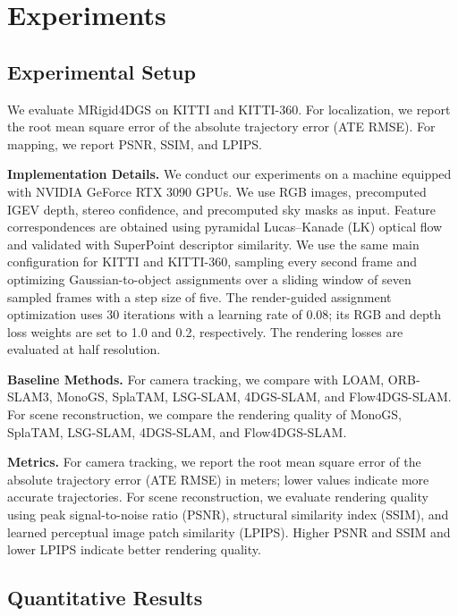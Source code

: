\section{Experiments}

\subsection{Experimental Setup}

We evaluate MRigid4DGS on KITTI and KITTI-360. For localization, we report the root mean square error of the absolute trajectory error (ATE RMSE). For mapping, we report PSNR, SSIM, and LPIPS.

\noindent\textbf{Implementation Details.}
We conduct our experiments on a machine equipped with NVIDIA GeForce RTX 3090 GPUs. We use RGB images, precomputed IGEV depth, stereo confidence, and precomputed sky masks as input. Feature correspondences are obtained using pyramidal Lucas--Kanade (LK) optical flow and validated with SuperPoint descriptor similarity. We use the same main configuration for KITTI and KITTI-360, sampling every second frame and optimizing Gaussian-to-object assignments over a sliding window of seven sampled frames with a step size of five. The render-guided assignment optimization uses 30 iterations with a learning rate of 0.08; its RGB and depth loss weights are set to 1.0 and 0.2, respectively. The rendering losses are evaluated at half resolution.

\noindent\textbf{Baseline Methods.}
For camera tracking, we compare with LOAM, ORB-SLAM3, MonoGS, SplaTAM, LSG-SLAM, 4DGS-SLAM, and Flow4DGS-SLAM. For scene reconstruction, we compare the rendering quality of MonoGS, SplaTAM, LSG-SLAM, 4DGS-SLAM, and Flow4DGS-SLAM.

\noindent\textbf{Metrics.}
For camera tracking, we report the root mean square error of the absolute trajectory error (ATE RMSE) in meters; lower values indicate more accurate trajectories. For scene reconstruction, we evaluate rendering quality using peak signal-to-noise ratio (PSNR), structural similarity index (SSIM), and learned perceptual image patch similarity (LPIPS). Higher PSNR and SSIM and lower LPIPS indicate better rendering quality.

\subsection{Quantitative Results}

